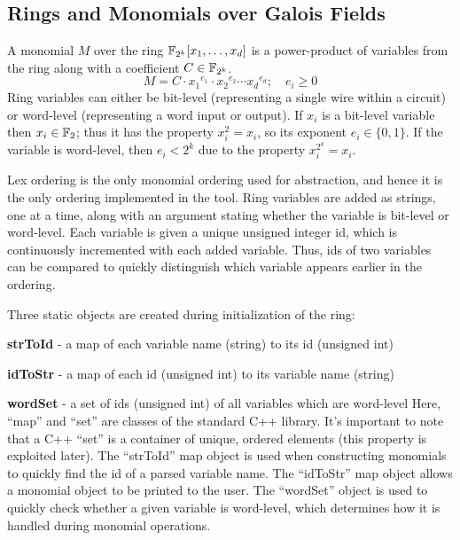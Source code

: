 \subsection{Rings and Monomials over Galois Fields}

A monomial $M$ over the ring ${\mathbb{F}}_{2^k}[x_1,\dots,x_d]$ is a power-product of variables from 
the ring along with a coefficient $C \in {\mathbb{F}}_{2^k}$.
\begin{equation}
M = C \cdot {x_1}^{e_1} \cdot {x_2}^{e_2} \cdots {x_d}^{e_d}; \quad e_i \geq 0
\end{equation}
Ring variables can either be bit-level (representing a single wire within a circuit) or 
word-level (representing a word input or output).
If $x_i$ is a bit-level variable then $x_i \in {\mathbb{F}}_2$; thus it has the property 
$x_i^2=x_i$, so its exponent $e_i \in \{0,1\}$. 
If the variable is word-level, then $e_i < 2^k$ due to the property $x_i^{2^k}=x_i$.

Lex ordering is the only monomial ordering used for abstraction, and hence it is
the only ordering implemented in the tool. Ring variables are added as strings,
one at a time, along with an argument stating whether the variable is bit-level
or word-level. Each variable is given a unique unsigned integer id, which is 
continuously incremented with each added variable. Thus, ids of two variables 
can be compared to quickly distinguish which variable appears earlier in the 
ordering.

Three static objects are created during initialization of the 
ring:
\bi
\item {\bf strToId} - a map of each variable name (string) to its id (unsigned int)
\item {\bf idToStr} - a map of each id (unsigned int) to its variable name (string)
\item {\bf wordSet} - a set of ids (unsigned int) of all variables which are word-level
\ei
Here, ``map'' and ``set'' are classes of the standard C++ library.
It's important to note that a C++ ``set'' is a container of unique, ordered 
elements (this property is exploited later).
The ``strToId'' map object
is used when constructing monomials to quickly find the id of a parsed variable 
name. The ``idToStr'' map object allows a monomial object to be printed to
the user. The ``wordSet'' object is used to quickly check whether a given variable
is word-level, which determines how it is handled during monomial operations.

